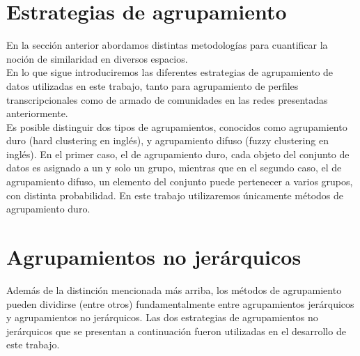 \section{Estrategias de agrupamiento}
En la sección anterior abordamos distintas metodologías para cuantificar la noción de similaridad en diversos espacios.\\
En lo que sigue introduciremos las diferentes estrategias de agrupamiento de datos utilizadas en este trabajo, tanto para agrupamiento de perfiles transcripcionales como de armado de comunidades en las redes presentadas anteriormente.\\
Es posible distinguir dos tipos de agrupamientos, conocidos como agrupamiento duro (hard clustering en inglés), y agrupamiento difuso (fuzzy clustering en inglés). En el primer caso, el de agrupamiento duro, cada objeto del conjunto de datos es asignado a un y solo un grupo, mientras que en el segundo caso, el de agrupamiento difuso, un elemento del conjunto puede pertenecer a varios grupos, con distinta probabilidad. En este trabajo utilizaremos únicamente métodos de agrupamiento duro.\\
\section{Agrupamientos no jerárquicos}
\label{sec:agrupamientos_no_jerarquicos}
Además de la distinción mencionada más arriba, los métodos de agrupamiento pueden dividirse (entre otros) fundamentalmente entre agrupamientos jerárquicos y agrupamientos no jerárquicos.
Las dos estrategias de agrupamientos no jerárquicos que se presentan a continuación fueron utilizadas en el desarrollo de este trabajo.
